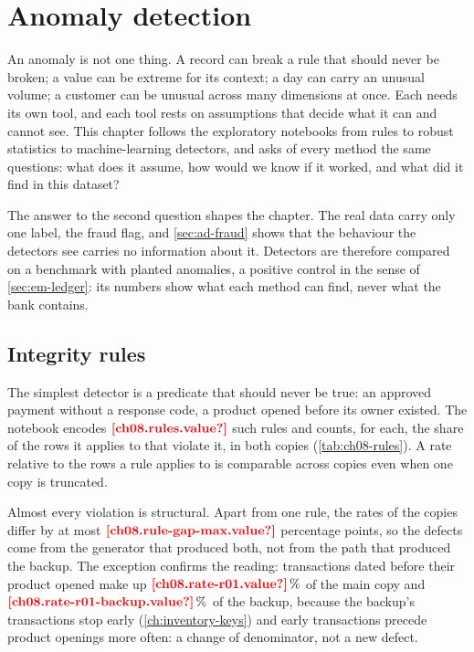 \chapter{Anomaly detection}\label{ch:anomaly-detection}

An anomaly is not one thing. A record can break a rule that should never be broken; a value can be extreme for its
context; a day can carry an unusual volume; a customer can be unusual across many dimensions at once. Each needs its
own tool, and each tool rests on assumptions that decide what it can and cannot see. This chapter follows the
exploratory notebooks from rules to robust statistics to machine-learning detectors, and asks of every method the
same questions: what does it assume, how would we know if it worked, and what did it find in this dataset?

The answer to the second question shapes the chapter. The real data carry only one label, the fraud flag, and
\cref{sec:ad-fraud} shows that the behaviour the detectors see carries no information about it. Detectors are
therefore compared on a benchmark with planted anomalies, a positive control in the sense of \cref{sec:em-ledger}:
its numbers show what each method can find, never what the bank contains.

\section{Integrity rules}\label{sec:ad-rules}

The simplest detector is a predicate that should never be true: an approved payment without a response code, a
product opened before its owner existed. The notebook encodes $\est{ch08.rules}{value}$ such rules and counts, for
each, the share of the rows it applies to that violate it, in both copies (\cref{tab:ch08-rules}). A rate relative to
the rows a rule applies to is comparable across copies even when one copy is truncated.



Almost every violation is structural. Apart from one rule, the rates of the copies differ by at most
$\est{ch08.rule-gap-max}{value}$ percentage points, so the defects come from the generator that produced both, not
from the path that produced the backup. The exception confirms the reading: transactions dated before their product
opened make up $\est{ch08.rate-r01}{value}\,\%$ of the main copy and $\est{ch08.rate-r01-backup}{value}\,\%$ of the
backup, because the backup's transactions stop early (\cref{ch:inventory-keys}) and early transactions precede product
openings more often: a change of denominator, not a new defect.

